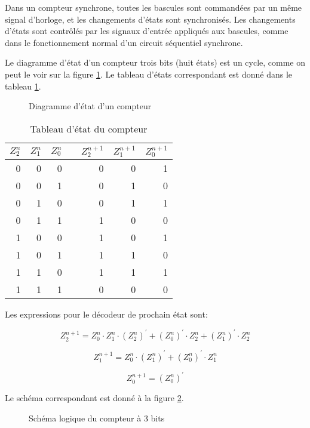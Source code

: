 \documentclass[11pt]{article}
\begin{document}
Dans un compteur synchrone, toutes les bascules sont commandées par un
même signal d'horloge, et les changements d'états sont
synchronisés. Les changements d'états sont contrôlés par les signaux
d'entrée appliqués aux bascules, comme dans le fonctionnement normal
d'un circuit séquentiel synchrone.

Le diagramme d'état d'un compteur trois bits (huit états) est un
cycle, comme on peut le voir sur la figure \ref{fig:orgc359d1c}. Le tableau
d'états correspondant est donné dans le tableau \ref{tab:orgdec8992}.


\begin{figure}[htbp]
\centering

\caption{\label{fig:orgc359d1c}Diagramme d'état d'un compteur}
\end{figure}

\begin{table}[htbp]
\caption{\label{tab:orgdec8992}Tableau d'état du compteur}
\centering
\begin{tabular}{rrrlrrr}
\(Z_2^n\) & \(Z_1^n\) & \(Z_0^n\) &  & \(Z_2^{n+1}\) & \(Z_1^{n+1}\) & \(Z_0^{n+1}\)\\
\hline
0 & 0 & 0 &  & 0 & 0 & 1\\
0 & 0 & 1 &  & 0 & 1 & 0\\
0 & 1 & 0 &  & 0 & 1 & 1\\
0 & 1 & 1 &  & 1 & 0 & 0\\
1 & 0 & 0 &  & 1 & 0 & 1\\
1 & 0 & 1 &  & 1 & 1 & 0\\
1 & 1 & 0 &  & 1 & 1 & 1\\
1 & 1 & 1 &  & 0 & 0 & 0\\
\end{tabular}
\end{table}

Les expressions pour le décodeur de prochain état sont: 

$$  Z_2^{n+1} = Z_0^n \cdot Z_1^n \cdot (Z_2^{n})^\prime + (Z_0^{n})^\prime \cdot Z_2^n + (Z_1^{n})^\prime \cdot Z_2^n $$

$$  Z_1^{n+1} = Z_0^{n} \cdot (Z_1^{n})^\prime + (Z_0^{n})^\prime \cdot Z_1^n $$

$$  Z_0^{n+1} = (Z_0^{n})^\prime $$


Le schéma correspondant est donné à la figure \ref{fig:orgbd394b5}.

\begin{figure}[htbp]
\centering

\caption{\label{fig:orgbd394b5}Schéma logique du compteur à 3 bits}
\end{figure}
\end{document}
